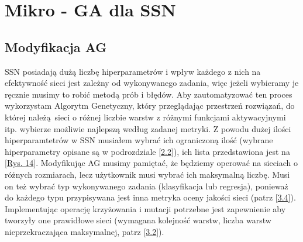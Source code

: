 \documentclass{article}
\begin{document}
\section{Mikro - GA dla SSN}
\subsection{Modyfikacja AG}
SSN posiadają dużą liczbę hiperparametrów i wpływ każdego z nich na efektywność sieci jest
zależny od wykonywanego zadania, więc jeżeli wybieramy je ręcznie musimy to robić
metodą prób i błędów.
Aby zautomatyzować ten proces wykorzystam Algorytm Genetyczny, który przeglądając przestrzeń
rozwiązań, do której należą sieci o różnej liczbie warstw z różnymi funkcjami aktywacyjnymi
itp. wybierze możliwie najlepszą według zadanej metryki.
Z powodu dużej ilości hiperparamtetrów w SSN musiałem wybrać ich ograniczoną ilość
(wybrane hiperparametry opisane są w podrozdziale [\hyperref[sec:ssn]{2.2}]), ich lista
przedstawiona jest na [\hyperref[fig:gen]{Rys. 14}].
Modyfikując AG musimy pamiętać, że będziemy operować na sieciach o różnych rozmiarach, lecz
użytkownik musi wybrać ich maksymalną liczbę. Musi on też wybrać typ wykonywanego zadania 
(klasyfikacja lub regresja), ponieważ do każdego typu przypisywana jest inna metryka
oceny jakości sieci (patrz [\hyperref[sec:ocena]{3.4}]).
Implementując operację krzyżowania i mutacji potrzebne jest zapewnienie aby tworzyły one
prawidłowe sieci (wymagana kolejność warstw, liczba warstw nieprzekraczająca maksymalnej,
 patrz [\hyperref[sec:ossn]{3.2}]).
\end{document}

